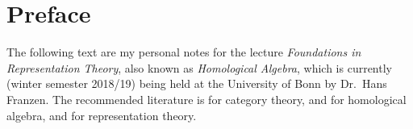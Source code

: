 \chapter{Preface}

The following text are my personal notes for the lecture \emph{Foundations in Representation Theory}, also known as \emph{Homological Algebra}, which is currently (winter semester 2018/19) being held at the University of Bonn by Dr.\ Hans Franzen.
The recommended literature is \cite{Working} for category theory, \cite[Chapter~1]{SheavesManifolds} and \cite{Weibel} for homological algebra, and \cite{Elements} for representation theory.
